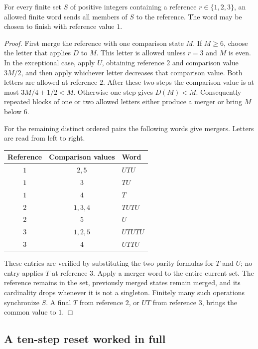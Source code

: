 \begin{lemma}\label{lem:protected-merger}
For every finite set $S$ of positive integers containing a reference
$r\in\{1,2,3\}$, an allowed finite word sends all members of $S$
to the reference. The word may be chosen to finish with reference
value $1$.
\end{lemma}
\begin{proof}
First merge the reference with one comparison state $M$.
If $M\ge6$, choose the letter that applies $D$ to $M$. This letter
is allowed unless $r=3$ and $M$ is even. In the exceptional case,
apply $U$, obtaining reference $2$ and comparison value $3M/2$,
and then apply whichever letter decreases that comparison value.
Both letters are allowed at reference $2$. After these two steps
the comparison value is at most $3M/4+1/2<M$.
Otherwise one step gives $D(M)<M$. Consequently repeated blocks of
one or two allowed letters either produce a merger or bring $M$
below $6$.

For the remaining distinct ordered pairs the following words give
mergers. Letters are read from left to right.
\begin{center}
\begin{tabular}{ccl}
\hline
Reference & Comparison values & Word\\
\hline
$1$ & $2,5$ & $UTU$\\
$1$ & $3$ & $TU$\\
$1$ & $4$ & $T$\\
$2$ & $1,3,4$ & $TUTU$\\
$2$ & $5$ & $U$\\
$3$ & $1,2,5$ & $UTUTU$\\
$3$ & $4$ & $UTTU$\\
\hline
\end{tabular}
\end{center}
These entries are verified by substituting the two parity formulas
for $T$ and $U$; no entry applies $T$ at reference $3$.
Apply a merger word to the entire current set. The reference remains
in the set, previously merged states remain merged, and its
cardinality drops whenever it is not a singleton. Finitely many
such operations synchronize $S$. A final $T$ from reference $2$,
or $UT$ from reference $3$, brings the common value to $1$.
\end{proof}

\subsection{A ten-step reset worked in full}

